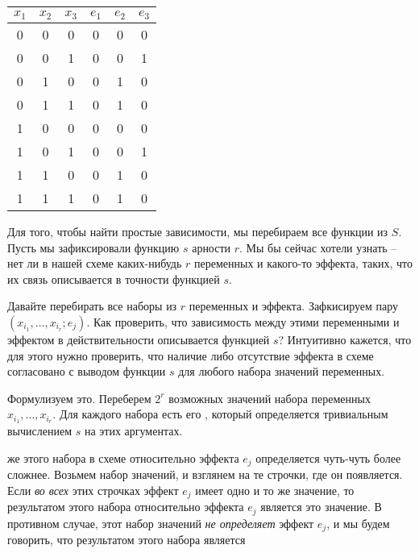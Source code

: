 \begin{framed}
	\begin{tabular}{c|c|c|c|c|c}
		$x_1$ & $x_2$ & $x_3$ & $e_1$ & $e_2$ & $e_3$ \\
		\hline
		0     & 0     & 0     &     0 & 0     & 0     \\
		0     & 0     & 1     &     0 & 0     & 1     \\
		0     & 1     & 0     &     0 & 1     & 0     \\
		0     & 1     & 1     &     0 & 1     & 0     \\
		1     & 0     & 0     &     0 & 0     & 0     \\
		1     & 0     & 1     &     0 & 0     & 1     \\
		1     & 1     & 0     &     0 & 1     & 0     \\
		1     & 1     & 1     &     0 & 1     & 0     \\
	\end{tabular}
\end{framed}

Для того, чтобы найти простые зависимости, мы перебираем все функции из $S$. Пусть мы зафиксировали функцию $s$ арности $r$. Мы бы сейчас хотели узнать -- нет ли в нашей схеме каких-нибудь $r$ переменных и какого-то эффекта, таких, что их связь описывается в точности функцией $s$. 

Давайте перебирать все наборы из $r$ переменных и эффекта. Зафкисируем пару $(x_{i_1}, \ldots, x_{i_r}; e_j)$. Как проверить, что зависимость между этими переменными и эффектом в действительности описывается функцией $s$? Интуитивно кажется, что для этого нужно проверить, что наличие либо отсутствие эффекта в схеме согласовано с выводом функции $s$ для любого набора значений переменных. 

Формулизуем это. Переберем $2^r$ возможных значений набора переменных $x_{i_1}, \ldots, x_{i_r}$. Для каждого набора есть его , который определяется тривиальным вычислением $s$ на этих аргументах. 

 же этого набора {в схеме относительно эффекта} $e_j$ определяется чуть-чуть более сложнее. Возьмем набор значений, и взглянем на те строчки, где он появляется. Если \emph{во всех} этих строчках эффект $e_j$ имеет одно и то же значение, то результатом этого набора относительно эффекта $e_j$ является это значение. В противном случае, этот набор значений \emph{не определяет} эффект $e_j$, и мы будем говорить, что результатом этого набора является 

